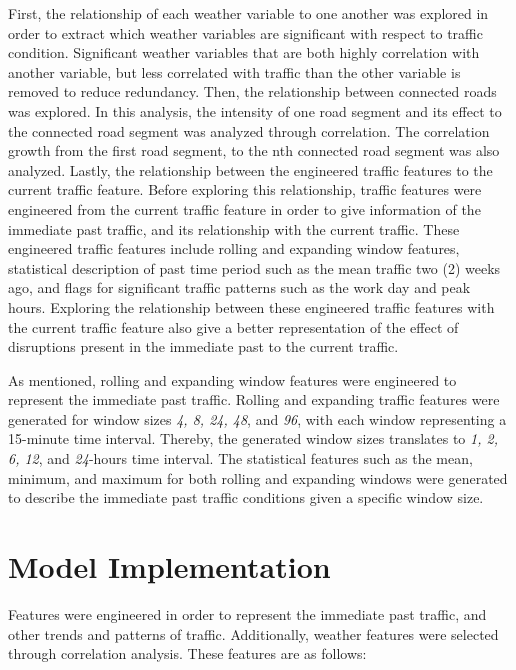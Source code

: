 First, the relationship of each weather variable to one another was explored in order to extract which weather variables are significant with respect to traffic condition. Significant weather variables that are both highly correlation with another variable, but less correlated with traffic than the other variable is removed to reduce redundancy. Then, the relationship between connected roads was explored. In this analysis, the intensity of one road segment and its effect to the connected road segment was analyzed through correlation. The correlation growth from the first road segment, to the nth connected road segment was also analyzed. Lastly, the relationship between the engineered traffic features to the current traffic feature. Before exploring this relationship, traffic features were engineered from the current traffic feature in order to give information of the immediate past traffic, and its relationship with the current traffic. These engineered traffic features include rolling and expanding window features, statistical description of past time period such as the mean traffic two (2) weeks ago, and flags for significant traffic patterns such as the work day and peak hours. Exploring the relationship between these engineered traffic features with the current traffic feature also give a better representation of the effect of disruptions present in the immediate past to the current traffic.

As mentioned, rolling and expanding window features were engineered to represent the immediate past traffic. Rolling and expanding traffic features were generated for window sizes \textit{4, 8, 24, 48}, and \textit{96}, with each window representing a 15-minute time interval. Thereby, the generated window sizes translates to \textit{1, 2, 6, 12}, and \textit{24}-hours time interval. The statistical features such as the mean, minimum, and maximum for both rolling and expanding windows were generated to describe the immediate past traffic conditions given a specific window size.



\section{Model Implementation}
Features were engineered in order to represent the immediate past traffic, and other trends and patterns of traffic. Additionally, weather features were selected through correlation analysis. These features are as follows:

